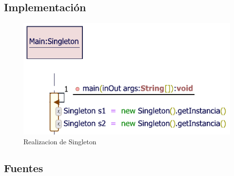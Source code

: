 \subsection{Implementación}
\begin{figure}[h!]
	\centering
	\includegraphics[width=0.7\linewidth]{PATRONES/imgs/MISingleton}
	\caption{Realizacion de Singleton}
	\label{fig:mrsingleton}
\end{figure}
\newpage


\subsection{Fuentes}
